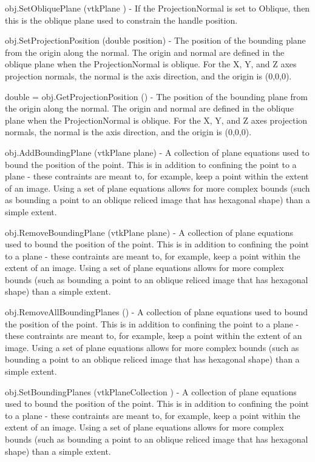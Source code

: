 \begin{DoxyItemize}
\item {\ttfamily obj.\-Set\-Oblique\-Plane (vtk\-Plane )} -\/ If the Projection\-Normal is set to Oblique, then this is the oblique plane used to constrain the handle position.  
\item {\ttfamily obj.\-Set\-Projection\-Position (double position)} -\/ The position of the bounding plane from the origin along the normal. The origin and normal are defined in the oblique plane when the Projection\-Normal is oblique. For the X, Y, and Z axes projection normals, the normal is the axis direction, and the origin is (0,0,0).  
\item {\ttfamily double = obj.\-Get\-Projection\-Position ()} -\/ The position of the bounding plane from the origin along the normal. The origin and normal are defined in the oblique plane when the Projection\-Normal is oblique. For the X, Y, and Z axes projection normals, the normal is the axis direction, and the origin is (0,0,0).  
\item {\ttfamily obj.\-Add\-Bounding\-Plane (vtk\-Plane plane)} -\/ A collection of plane equations used to bound the position of the point. This is in addition to confining the point to a plane -\/ these contraints are meant to, for example, keep a point within the extent of an image. Using a set of plane equations allows for more complex bounds (such as bounding a point to an oblique reliced image that has hexagonal shape) than a simple extent.  
\item {\ttfamily obj.\-Remove\-Bounding\-Plane (vtk\-Plane plane)} -\/ A collection of plane equations used to bound the position of the point. This is in addition to confining the point to a plane -\/ these contraints are meant to, for example, keep a point within the extent of an image. Using a set of plane equations allows for more complex bounds (such as bounding a point to an oblique reliced image that has hexagonal shape) than a simple extent.  
\item {\ttfamily obj.\-Remove\-All\-Bounding\-Planes ()} -\/ A collection of plane equations used to bound the position of the point. This is in addition to confining the point to a plane -\/ these contraints are meant to, for example, keep a point within the extent of an image. Using a set of plane equations allows for more complex bounds (such as bounding a point to an oblique reliced image that has hexagonal shape) than a simple extent.  
\item {\ttfamily obj.\-Set\-Bounding\-Planes (vtk\-Plane\-Collection )} -\/ A collection of plane equations used to bound the position of the point. This is in addition to confining the point to a plane -\/ these contraints are meant to, for example, keep a point within the extent of an image. Using a set of plane equations allows for more complex bounds (such as bounding a point to an oblique reliced image that has hexagonal shape) than a simple extent.  

\end{DoxyItemize}
